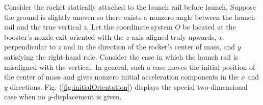 \documentclass[11pt]{thesis}
\numberwithin{equation}{section}
\begin{document}
Consider the rocket statically attached to the launch rail before launch. Suppose the ground is slightly uneven so there exists a nonzero angle between the launch rail and the true vertical $z$. Let the coordinate system $\mathit{O}$ be located at the booster's nozzle exit oriented with the $z$ axis aligned truly upwards, $x$ perpendicular to $z$ and in the direction of the rocket's center of mass, and $y$ satisfying the right-hand rule. Consider the case in which the launch rail is misaligned with the vertical. In general, such a case moves the initial position of the center of mass and gives nonzero initial acceleration components in the $x$ and $y$ directions. Fig. (\ref{fig:initialOrientation}) displays the special two-dimensional case when no $y$-displacement is given.
\begin{figure}[H]
\begin{center}
\pgfmathsetmacro{\maxXRail}{\sizez/\m} %
\pgfmathsetmacro{\perpOnex}{\perpperc*\maxXRail} %
\pgfmathsetmacro{\perpOney}{\perpOnex*\m} %
\pgfmathsetmacro{\perpTwox}{\perpOnex+\m*\m*\Ocgx/\mSqPO-\m*\Ocgy/\mSqPO} %
\pgfmathsetmacro{\perpTwoy}{\perpOney+\perpm*\perpTwox-\perpm*\perpOnex} %
\pgfmathsetmacro{\perpTwoxMinusperpOnex}{\perpTwox-\perpOnex}
\pgfmathsetmacro{\perpTwoyMinusperpOney}{\perpTwoy-\perpOney}
\pgfmathsetmacro{\longx}{\perpOnex + \hypot*\secdphi}

\end{center}
\end{figure}
\end{document}
